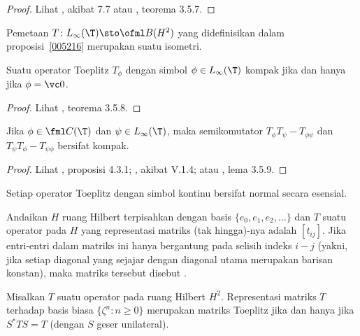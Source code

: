 \begin{proof} Lihat \cite{Douglas:1972}, akibat 7.7 atau \cite{Murphy:1990}, teorema 3.5.7. \ns
\end{proof}

\begin{cor} Pemetaan $T\colon L_\infty(\T) \sto \ofml B(H^2)$ yang didefinisikan dalam
proposisi~\ref{005216} merupakan suatu isometri.
\end{cor}

\begin{prop} Suatu operator Toeplitz $T_\phi$ dengan simbol $\phi \in L_\infty(\T)$ kompak jika
dan hanya jika $\phi = \vc 0$.
\end{prop}

\begin{proof} Lihat \cite{Murphy:1990}, teorema 3.5.8.  \ns \end{proof}

\begin{prop} Jika $\phi \in \fml C(\T)$ dan $\psi \in L_\infty(\T)$, maka
semikomutator $T_\phi T_\psi - T_{\phi\psi}$ dan $T_\psi T_\phi - T_{\psi\phi}$ bersifat
kompak.
\end{prop}

\begin{proof} Lihat \cite{Arveson:2002}, proposisi 4.3.1; \cite{Davidson:1996}, akibat
V.1.4; atau \cite{Murphy:1990}, lema 3.5.9. \ns
\end{proof}

\begin{cor} Setiap operator Toeplitz dengan simbol kontinu bersifat normal secara esensial.
\end{cor}

\begin{defn} Andaikan $H$ ruang Hilbert terpisahkan dengan basis $\{e_0, e_1, e_2,
\dots\}$ dan $T$ suatu operator pada $H$ yang representasi matriks (tak hingga)-nya adalah
$[t_{ij}]$. Jika entri-entri dalam matriks ini hanya bergantung pada selisih indeks $i
- j$ (yakni, jika setiap diagonal yang sejajar dengan diagonal utama merupakan barisan konstan),
maka matriks tersebut disebut
.
\end{defn}

\begin{prop} Misalkan $T$ suatu operator pada ruang Hilbert $H^2$. Representasi matriks
$T$ terhadap basis biasa $\{\zeta^n\colon n \ge 0\}$ merupakan matriks Toeplitz jika
dan hanya jika $S^*TS = T$ (dengan $S$ geser unilateral).
\end{prop}

